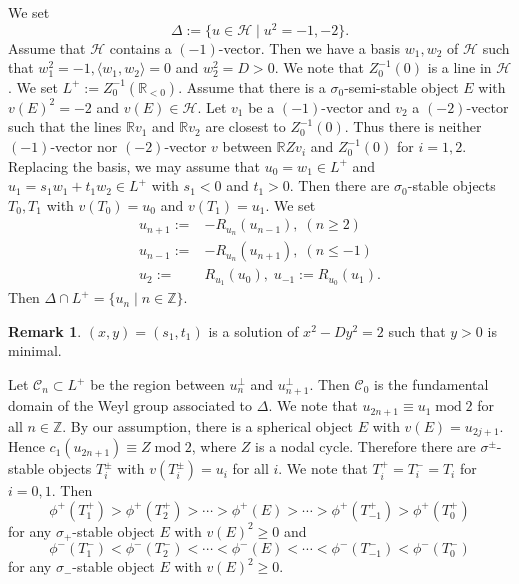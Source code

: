 \documentclass[leqno,11pt]{amsart}
\def\R{\ensuremath{\mathbb{R}}}
\def\Z{\ensuremath{\mathbb{Z}}}
\def\mod{\mathop{\mathrm{mod}}\nolimits}
\theoremstyle{definition}
\newtheorem{Rem}[Thm]{Remark}
\def\R{\ensuremath{\mathbb{R}}}
\def\Z{\ensuremath{\mathbb{Z}}}
\def\CC{\ensuremath{\mathcal C}}
\def\HH{\ensuremath{\mathcal H}}
\begin{document}
We set 
\begin{equation}
\Delta:=\{ u \in \HH \mid u^2=-1,-2 \}.
\end{equation}
Assume that $\HH$ contains a $(-1)$-vector. 
Then we have a basis $w_1,w_2$ of $\HH$ such that
$w_1^2=-1,\langle w_1,w_2 \rangle=0$ and $w_2^2=D>0$. 
We note that $Z_0^{-1}(0)$ is a line in $\HH$.
We set $L^+:=Z_0^{-1}(\R_{<0})$.
Assume that there is a $\sigma_0$-semi-stable object $E$ with 
$v(E)^2=-2$ and $v(E) \in \HH$.
Let $v_1$ be a $(-1)$-vector and $v_2$ a $(-2)$-vector
such that the lines $\R v_1$ and $\R v_2$ are closest to $Z_0^{-1}(0)$.
Thus there is neither $(-1)$-vector nor $(-2)$-vector $v$ between 
$\R Z v_i$ and $Z_0^{-1}(0)$ for $i=1,2$.
Replacing the basis, we may assume that $u_0=w_1 \in L^+$
and $u_1=s_1 w_1+t_1 w_2\in L^+$ with $s_1<0$ and $t_1>0$.
Then  there are $\sigma_0$-stable objects $T_0,T_1$ with
$v(T_0)=u_0$ and $v(T_1)=u_1$.
We set 
\begin{equation}
\begin{split}
u_{n+1}:=& -R_{u_n}(u_{n-1}),\;(n \geq 2)\\
u_{n-1}:=& -R_{u_n}(u_{n+1}),\;(n \leq -1)\\
u_2:=& R_{u_1}(u_0),\;u_{-1}:=R_{u_0}(u_1).
\end{split}
\end{equation}
Then $\Delta \cap L^+=\{ u_n \mid n \in \Z \}$.
\begin{Rem}
$(x,y)=(s_1,t_1)$ is a solution of $x^2-D y^2=2$ such that
$y>0$ is minimal.
\end{Rem}
Let $\CC_n \subset L^+$ be the region between 
$u_n^\perp$ and $u_{n+1}^\perp$. 
Then $\CC_0$ is the fundamental domain of the Weyl group associated to
$\Delta$.
We note that $u_{2n+1} \equiv u_1 \mod 2$ for all $n \in \Z$.
By our assumption, there is a spherical object $E$ with
$v(E)=u_{2j+1}$. Hence $c_1(u_{2n+1}) \equiv Z \mod 2$, where
$Z$ is a nodal cycle.   
Therefore there are $\sigma^\pm$-stable objects $T_i^\pm$
with $v(T_i^\pm)=u_i$ for all $i$.
We note that $T_i^+=T_i^-=T_i$ for $i=0,1$.
Then 
\begin{equation}
\phi^+(T_1^+) > \phi^+(T_2^+)>\cdots>\phi^+(E)>
\cdots >\phi^+(T_{-1}^+)>\phi^+(T_0^+)
\end{equation}
for any $\sigma_+$-stable object $E$ with
$v(E)^2 \geq 0$
and
\begin{equation}
\phi^-(T_1^-) < \phi^-(T_2^-)<\cdots<\phi^-(E)<
\cdots <\phi^-(T_{-1}^-)<\phi^-(T_0^-)
\end{equation}
for any $\sigma_-$-stable object $E$ with
$v(E)^2 \geq 0$.
\end{document}
